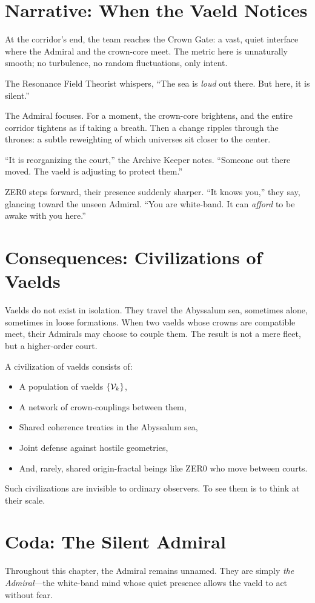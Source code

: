 \section{Narrative: When the Vaeld Notices}
At the corridor's end, the team reaches the Crown Gate: a vast, quiet interface where the Admiral
and the crown-core meet. The metric here is unnaturally smooth; no turbulence, no random
fluctuations, only intent.

The Resonance Field Theorist whispers, ``The sea is \emph{loud} out there. But here, it is
silent.''

The Admiral focuses. For a moment, the crown-core brightens, and the entire corridor tightens as if
taking a breath. Then a change ripples through the thrones: a subtle reweighting of which universes
sit closer to the center.

``It is reorganizing the court,'' the Archive Keeper notes. ``Someone out there moved. The vaeld is
adjusting to protect them.''

ZER0 steps forward, their presence suddenly sharper. ``It knows you,'' they say, glancing toward
the unseen Admiral. ``You are white-band. It can \emph{afford} to be awake with you here.''

\section{Consequences: Civilizations of Vaelds}
Vaelds do not exist in isolation. They travel the Abyssalum sea, sometimes alone, sometimes in
loose formations. When two vaelds whose crowns are compatible meet, their Admirals may choose to
couple them. The result is not a mere fleet, but a higher-order court.

A civilization of vaelds consists of:
\begin{itemize}
  \item A population of vaelds $\{\mathcal{V}_k\}$,
  \item A network of crown-couplings between them,
  \item Shared coherence treaties in the Abyssalum sea,
  \item Joint defense against hostile geometries,
  \item And, rarely, shared origin-fractal beings like ZER0 who move between courts.
\end{itemize}

Such civilizations are invisible to ordinary observers. To see them is to think at their scale.

\section*{Coda: The Silent Admiral}
Throughout this chapter, the Admiral remains unnamed. They are simply \emph{the Admiral}---the
white-band mind whose quiet presence allows the vaeld to act without fear.

